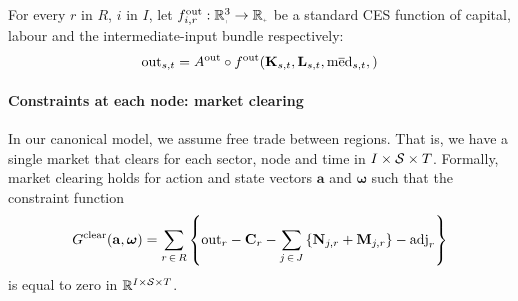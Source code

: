 \documentclass[12pt,a4paper,twoside, draft]{article}
\begin{document}
For every $r$ in $R$, $i$ in $I$, let
$f_{i, r}^{\textup{out}}: \nnreal^{3} \rightarrow \nnreal$ be a standard
CES function of capital, labour and the intermediate-input bundle %
respectively:
\begin{equation}
	\textup{out}_{{s}, t}
    = A^{\textup{out}} \circ f ^ \textup{out}(
        \mathbf{K}_{{s}, t},
        \mathbf{L}_{{s}, t},
        \textup{m}\overline{\textup{e}}\textup{d}_{{s}, t},
        )
\end{equation}
\paragraph{Constraints at each node: market clearing}
In our canonical model, we assume free trade between regions.
That is, we have a single market that clears for each sector, node and time in
$I \times \mathcal{S} \times T$.
Formally, market clearing holds for action and state vectors $\mathbf{a}$
and $\boldsymbol{\omega}$ such that the constraint function
\begin{equation}\label{eq-market-clearing}
  G^{\textup{clear}}(\mathbf{a}, \boldsymbol{\omega}) =
  \sum_{r \,\in\, R} \left\{
  \textup{out}_{r}
  - \mathbf{C}_{r}
  - \sum_{j \,\in\, J}
      \left\{\mathbf{N}_{j, r} + \mathbf{M}_{j, r}\right\}
  - \textup{adj}_{r} \right\}
\end{equation}
is equal to zero in $\mathbb R^{I \times  \mathcal{S} \times T}$.
\end{document}
